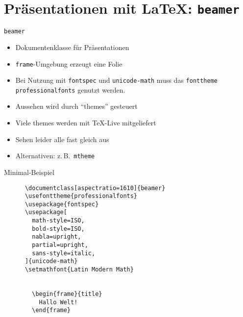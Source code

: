 \section{Präsentationen mit \LaTeX: \texttt{beamer}}

\begin{frame}[fragile]{
  \texttt{beamer}
  \hfill
}
  \begin{itemize}
    \item Dokumentenklasse für Präsentationen
    \item \lstinline+frame+-Umgebung erzeugt eine Folie
    \item Bei Nutzung mit \lstinline+fontspec+ und \lstinline+unicode-math+ muss das \texttt{fonttheme} \texttt{professionalfonts} genutzt werden.
    \item Aussehen wird durch \enquote{themes} gesteuert
    \item Viele themes werden mit \TeX-Live mitgeliefert
    \item Sehen leider alle fast gleich aus
    \item Alternativen: z.\,B.~\texttt{mtheme}
  \end{itemize}
\end{frame}

\begin{BeamerCodeFrame}[fragile]{Minimal-Beispiel}
  \begin{center}
    \begin{lstlisting}
      \documentclass[aspectratio=1610]{beamer}
      \usefonttheme{professionalfonts}
      \usepackage{fontspec}
      \usepackage[
        math-style=ISO,
        bold-style=ISO,
        nabla=upright,
        partial=upright,
        sans-style=italic,
      ]{unicode-math}
      \setmathfont{Latin Modern Math}

      
        \begin{frame}{title}
          Hallo Welt!
        \end{frame}
      
    \end{lstlisting}
  \end{center}
\end{BeamerCodeFrame}

